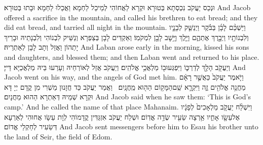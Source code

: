 {וּנְכַס יַעֲקֹב נִכְסְתָא בְּטוּרָא וּקְרָא לַאֲחוֹהִי לְמֵיכַל לַחְמָא וַאֲכַלוּ לַחְמָא וּבָתוּ בְּטוּרָא׃}
{And Jacob offered a sacrifice in the mountain, and called his brethren to eat bread; and they did eat bread, and tarried all night in the mountain.}{}
\newperek
{}%
{וַיַּשְׁכֵּ֨ם לָבָ֜ן בַּבֹּ֗קֶר וַיְנַשֵּׁ֧ק לְבָנָ֛יו וְלִבְנוֹתָ֖יו וַיְבָ֣רֶךְ אֶתְהֶ֑ם וַיֵּ֛לֶךְ וַיָּ֥שׇׁב לָבָ֖ן לִמְקֹמֽוֹ׃}
{וְאַקְדֵּים לָבָן בְּצַפְרָא וְנַשֵּׁיק לִבְנוֹהִי וְלִבְנָתֵיהּ וּבָרֵיךְ יָתְהוֹן וַאֲזַל וְתָב לָבָן לְאַתְרֵיהּ׃}
{And Laban arose early in the morning, kissed his sons and daughters, and blessed them; and then Laban went and returned to his place.}{}
{וְיַעֲקֹ֖ב הָלַ֣ךְ לְדַרְכּ֑וֹ וַיִּפְגְּעוּ\maqqaf ב֖וֹ מַלְאֲכֵ֥י אֱלֹהִֽים׃}
{וְיַעֲקֹב אֲזַל לְאוֹרְחֵיהּ וְעָרַעוּ בֵּיהּ מַלְאֲכַיָּא דַּייָ׃}
{And Jacob went on his way, and the angels of God met him.}{}
{וַיֹּ֤אמֶר יַעֲקֹב֙ כַּאֲשֶׁ֣ר רָאָ֔ם מַחֲנֵ֥ה אֱלֹהִ֖ים זֶ֑ה וַיִּקְרָ֛א שֵֽׁם\maqqaf הַמָּק֥וֹם הַה֖וּא מַֽחֲנָֽיִם׃ \petucha }
{וַאֲמַר יַעֲקֹב כַּד חֲזָנוּן מַשְׁרִי מִן קֳדָם יְיָ דָּא וּקְרָא שְׁמֵיהּ דְּאַתְרָא הַהוּא מַחֲנָיִם׃}
{And Jacob said when he saw them: ‘This is God’s camp.’ And he called the name of that place Mahanaim.}{}
\newseder
{}%
{וַיִּשְׁלַ֨ח יַעֲקֹ֤ב מַלְאָכִים֙ לְפָנָ֔יו אֶל\maqqaf עֵשָׂ֖ו אָחִ֑יו אַ֥רְצָה שֵׂעִ֖יר שְׂדֵ֥ה אֱדֽוֹם׃}
{וּשְׁלַח יַעֲקֹב אִזְגַּדִּין קֳדָמוֹהִי לְוָת עֵשָׂו אֲחוּהִי לְאַרְעָא דְּשֵׂעִיר לְחַקְלֵי אֱדוֹם׃}
{And Jacob sent messengers before him to Esau his brother unto the land of Seir, the field of Edom.}{}
